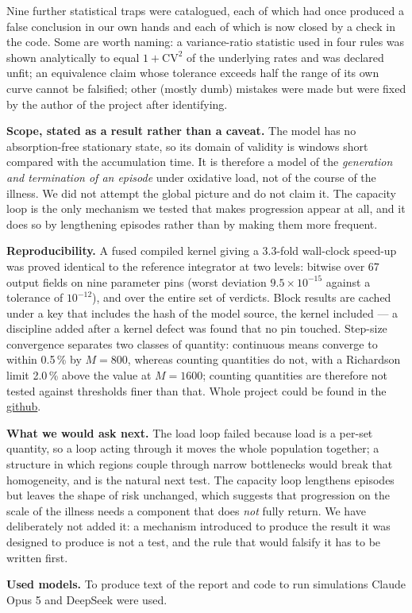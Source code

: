 \documentclass[11pt,a4paper]{article}
\begin{document}
Nine further statistical traps were catalogued, each of which had once produced a false conclusion
in our own hands and each of which is now closed by a check in the code. Some are worth naming:
a variance-ratio statistic used in four rules was shown analytically to equal $1+\mathrm{CV}^2$ of
the underlying rates and was declared unfit; an equivalence claim whose tolerance exceeds half the
range of its own curve cannot be falsified; other (mostly dumb) mistakes were made but were fixed by the author
of the project after identifying.

\vspace{2pt}
\noindent\textbf{Scope, stated as a result rather than a caveat.} The model has no absorption-free
stationary state, so its domain of validity is windows short compared with the accumulation time.
It is therefore a model of the \emph{generation and termination of an episode} under oxidative
load, not of the course of the illness. We did not attempt the global picture and do not claim it.
The capacity loop is the only mechanism we tested that makes progression appear at all, and it does
so by lengthening episodes rather than by making them more frequent.

\vspace{2pt}
\noindent\textbf{Reproducibility.} A fused compiled kernel giving a 3.3-fold wall-clock speed-up was
proved identical to the reference integrator at two levels: bitwise over 67 output fields on nine
parameter pins (worst deviation $9.5\times10^{-15}$ against a tolerance of $10^{-12}$), and over the
entire set of verdicts. Block results are cached under a key that includes the hash of the model
source, the kernel included --- a discipline added after a kernel defect was found that no pin
touched. Step-size convergence separates two classes of quantity: continuous means converge to
within 0.5\,\% by $M=800$, whereas counting quantities do not, with a Richardson limit 2.0\,\% above
the value at $M=1600$; counting quantities are therefore not tested against thresholds finer than
that. Whole project could be found in the \hyperref[row:target]{github}.

\vspace{2pt}
\noindent\textbf{What we would ask next.} The load loop failed because load is a per-set quantity,
so a loop acting through it moves the whole population together; a structure in which regions couple
through narrow bottlenecks would break that homogeneity, and is the natural next test. The capacity
loop lengthens episodes but leaves the shape of risk unchanged, which suggests that progression on
the scale of the illness needs a component that does \emph{not} fully return. We have deliberately
not added it: a mechanism introduced to produce the result it was designed to produce is not a test,
and the rule that would falsify it has to be written first.

\vspace{2 pt}
\noindent\textbf{Used models.} To produce text of the report and code to run simulations Claude Opus 5 and DeepSeek were used.
\end{document}
